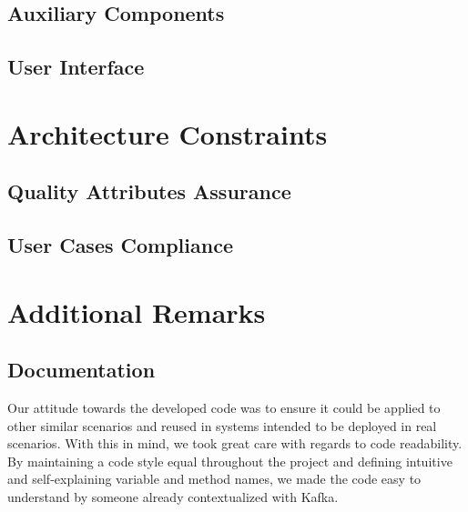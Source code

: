 \documentclass[12pt]{article}
\begin{document}
\subsection{Auxiliary Components}

\subsection{User Interface} \label{ui} %


\newpage
\section{Architecture Constraints} \label{constraints} %


\subsection{Quality Attributes Assurance} \label{qaa} %


\subsection{User Cases Compliance} \label{compliance} %


\newpage
\section{Additional Remarks} \label{remarks} %

\subsection{Documentation} \label{documentation} %

Our attitude towards the developed code was to ensure it could be applied to other similar scenarios and reused in systems intended to be deployed in real scenarios.
With this in mind, we took great care with regards to code readability.
By maintaining a code style equal throughout the project and defining intuitive and self-explaining variable and method names, we made the code easy to understand
by someone already contextualized with Kafka.
\end{document}
